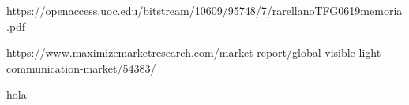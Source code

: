 
https://openaccess.uoc.edu/bitstream/10609/95748/7/rarellanoTFG0619memoria.pdf




https://www.maximizemarketresearch.com/market-report/global-visible-light-communication-market/54383/



hola